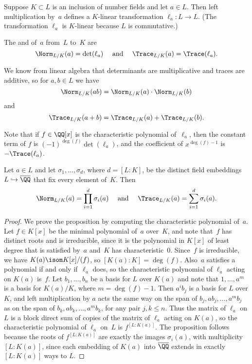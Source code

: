 Suppose $K\subset L$ is an inclusion of number fields and let $a\in
L$.  Then left multiplication by~$a$ defines a $K$-linear
transformation $\ell_a:L\to L$.  (The transformation $\ell_a$ is
$K$-linear because $L$ is commutative.)

\begin{definition}\label{defn:normtrace}
  The  and  of~$a$ from~$L$ to~$K$ are
  $$
    \Norm_{L/K}(a)=\det(\ell_a)
    \quad\text{ and }\quad
    \Trace_{L/K}(a)=\Trace(\ell_a).
  $$
\end{definition}
We know from linear algebra that
determinants are multiplicative
and traces are additive, so for $a,b\in L$ we have
$$\Norm_{L/K}(ab) = \Norm_{L/K}(a)\cdot \Norm_{L/K}(b)$$
and
$$\Trace_{L/K}(a+b) = \Trace_{L/K}(a) + \Trace_{L/K}(b).$$

Note that if $f\in\QQ[x]$ is the characteristic polynomial of~$\ell_a$,
then the constant term of $f$ is $(-1)^{\deg(f)}\det(\ell_a)$, and the
coefficient of $x^{\deg(f)-1}$ is $-\Trace(\ell_a)$.

\begin{proposition}\label{prop:normtracesigma}
  Let $a\in L$ and let $\sigma_1,\dots, \sigma_d$, where $d=[L:K]$, be
  the distinct field embeddings $L \hookrightarrow \overline{\QQ}$ that fix every element
  of~$K$.  Then
  $$
    \Norm_{L/K}(a) = \prod_{i=1}^d \sigma_i(a)
    \quad\text{ and }\quad
    \Trace_{L/K}(a) = \sum_{i=1}^d \sigma_i(a).
  $$
\end{proposition}
\begin{proof}
  We prove the proposition by computing the characteristic
  polynomial of~$a$.  Let $f\in K[x]$ be the minimal polynomial
  of~$a$ over~$K$, and note that~$f$ has distinct roots and is
  irreducible, since it is the polynomial in $K[x]$ of least degree
  that is satisfied by~$a$ and~$K$ has characteristic~$0$.  Since~$f$
  is irreducible, we have $K(a) \isom K[x]/(f)$, so $[K(a):K]=\deg(f)$.
  Also~$a$ satisfies a polynomial if and only if~$\ell_a$ does, so the
  characteristic polynomial of $\ell_a$ acting on $K(a)$ is~$f$.  Let
  $b_1,\dots,b_n$ be a basis for $L$ over $K(a)$ and note that
  $1,\dots, a^m$ is a basis for $K(a)/K$, where $m=\deg(f)-1$.  Then
  $a^i b_j$ is a basis for $L$ over $K$, and left multiplication by
  $a$ acts the same way on the span of $b_j, a b_j, \dots, a^m b_j$
  as on the span of $b_k, a b_k, \dots, a^m b_k$, for any pair $j,
  k\leq n$.  Thus the matrix of $\ell_a$ on $L$ is a block direct sum
  of copies of the matrix of $\ell_a$ acting on $K(a)$, so the
  characteristic polynomial of $\ell_a$ on~$L$ is $f^{[L:K(a)]}$.  The
  proposition follows because the roots of $f^{[L:K(a)]}$ are exactly
  the images $\sigma_i(a)$, with multiplicity $[L:K(a)]$, since each
  embedding of $K(a)$ into $\overline{\QQ}$ extends in exactly $[L:K(a)]$ ways
  to $L$.
\end{proof}

